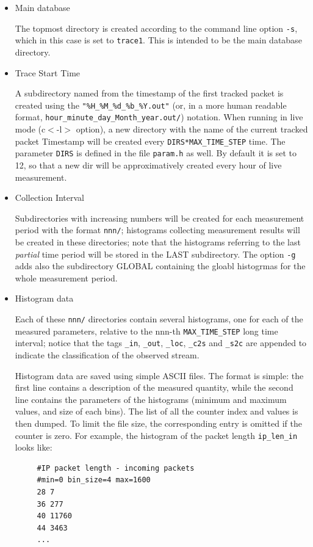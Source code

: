 \documentclass[11pt]{article}
\begin{document}
\begin{itemize}

\item Main database

The topmost directory is created according to the command line option \texttt{-s},
which in this case is set to \texttt{trace1}. This is intended to be the main database
directory.


\item Trace Start Time

A subdirectory named from the timestamp of the first tracked packet is created using
the \texttt{"\%H\_\%M\_\%d\_\%b\_\%Y.out"} (or, in a more  human readable format,
\texttt{hour\_minute\_day\_Month\_year.out/}) notation. When running in live mode (c$<$-l$>$
option), a new directory with the name of the current tracked packet Timestamp
will be created every \texttt{DIRS*MAX\_TIME\_STEP} time. The parameter \texttt{DIRS} is
defined in the file \texttt{param.h} as well. By default it is set to 12, so that a
new dir will be approximatively created every hour of live measurement.


\item Collection Interval

Subdirectories with increasing numbers will be created for each measurement
period with the format \texttt{nnn/}; histograms collecting measurement results will
be created in these directories; note that the histograms referring to the last
\textit{partial} time period will be stored in the LAST subdirectory. The option \texttt{-g}
adds also the subdirectory GLOBAL containing the gloabl histogrmas for the whole
measurement period.


\item Histogram data

Each of these \texttt{nnn/}  directories contain several histograms, one for each of 
the measured parameters, relative to the nnn-th \texttt{MAX\_TIME\_STEP} long time interval;
notice that the tags \texttt{\_in}, \texttt{\_out}, \texttt{\_loc}, \texttt{\_c2s} and \texttt{\_s2c}
are appended to indicate the classification of the observed stream.



Histogram data are saved using simple ASCII files.
The format is simple: the first line contains a description of the
measured quantity, while the second line contains the parameters of the histograms
(minimum and maximum values, and size of each bins). The list of all
the counter index and values is then dumped. To limit the file size, the
corresponding entry is omitted if the counter is zero.
For example, the histogram of the packet length \texttt{ip\_len\_in} looks like:

\begin{small}\begin{verbatim}
     #IP packet length - incoming packets
     #min=0 bin_size=4 max=1600
     28 7
     36 277
     40 11760
     44 3463
     ...
\end{verbatim}\end{small} \noindent
\end{itemize}
\end{document}
